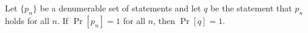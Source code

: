 Let $\{p_n\}$ be a denumerable set of statements and let $q$ be the statement that $p_n$ holds for all $n$. If $\Pr[p_n] = 1$ for all $n$, then $\Pr[q] = 1$.